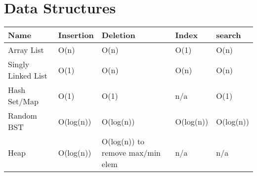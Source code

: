 \section{Data Structures}
\begin{center}
\begin{longtable}{|l|l|l|l|l|}
\hline
\textbf{Name} & \textbf{Insertion} & \textbf{Deletion} & \textbf{Index} & \textbf{search} \\
\hline 

Array List & O(n) & O(n) & O(1) & O(n) \\

\hline

Singly Linked List & O(1) & O(n) & O(n) & O(n) \\

\hline

Hash Set/Map & O(1) & O(1) & n/a & O(1) \\

\hline 

Random BST & O(log(n)) & O(log(n)) & O(log(n)) & O(log(n)) \\

\hline 

Heap & O(log(n)) & O(log(n)) to remove max/min elem & n/a & n/a \\

\hline 

\end{longtable}
\end{center}